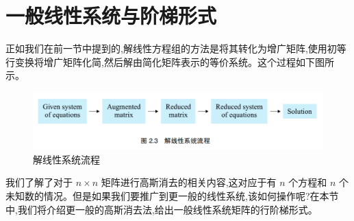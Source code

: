 

\section{一般线性系统与阶梯形式}
正如我们在前一节中提到的,解线性方程组的方法是将其转化为增广矩阵,使用初等行变换将增广矩阵化简,然后解由简化矩阵表示的等价系统。这个过程如下图所示。

\begin{figure}[h]
    \centering
    \includegraphics[width=\linewidth]{../images/2.1-1.png} %
    \caption{解线性系统流程}
    \label{fig:linear_system_process}
\end{figure}

我们了解了对于 \(n \times n\) 矩阵进行高斯消去的相关内容,这对应于有 \(n\) 个方程和 \(n\) 个未知数的情况。但是如果我们要推广到更一般的线性系统,该如何操作呢?在本节中,我们将介绍更一般的高斯消去法,给出一般线性系统矩阵的行阶梯形式。

